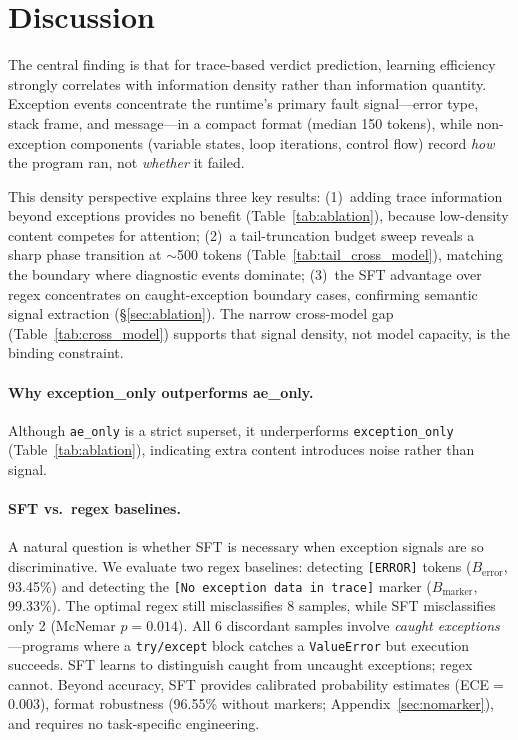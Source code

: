 \section{Discussion}

The central finding is that for trace-based verdict prediction, learning efficiency strongly correlates with information density rather than information quantity.
Exception events concentrate the runtime's primary fault signal---error type, stack frame, and message---in a compact format (median 150 tokens), while non-exception components (variable states, loop iterations, control flow) record \emph{how} the program ran, not \emph{whether} it failed.

This density perspective explains three key results: (1)~adding trace information beyond exceptions provides no benefit (Table~\ref{tab:ablation}), because low-density content competes for attention; (2)~a tail-truncation budget sweep reveals a sharp phase transition at ${\sim}$500 tokens (Table~\ref{tab:tail_cross_model}), matching the boundary where diagnostic events dominate; (3)~the SFT advantage over regex concentrates on caught-exception boundary cases, confirming semantic signal extraction (\S\ref{sec:ablation}).
The narrow cross-model gap (Table~\ref{tab:cross_model}) supports that signal density, not model capacity, is the binding constraint.

\paragraph{Why exception\_only outperforms ae\_only.}
Although \texttt{ae\_only} is a strict superset, it underperforms \texttt{exception\_only} (Table~\ref{tab:ablation}), indicating extra content introduces noise rather than signal.

\paragraph{SFT vs.\ regex baselines.}
A natural question is whether SFT is necessary when exception signals are so discriminative.
We evaluate two regex baselines: detecting \texttt{[ERROR]} tokens ($B_{\text{error}}$, 93.45\%)
and detecting the \texttt{[No exception data in trace]} marker ($B_{\text{marker}}$, 99.33\%).
The optimal regex still misclassifies 8 samples, while SFT misclassifies only 2
(McNemar $p{=}0.014$). All 6 discordant samples involve \emph{caught exceptions}---programs
where a \texttt{try/except} block catches a \texttt{ValueError} but execution succeeds.
SFT learns to distinguish caught from uncaught exceptions; regex cannot.
Beyond accuracy, SFT provides calibrated probability estimates (ECE${=}$0.003),
format robustness (96.55\% without markers; Appendix~\ref{sec:nomarker}), and requires no task-specific engineering.

